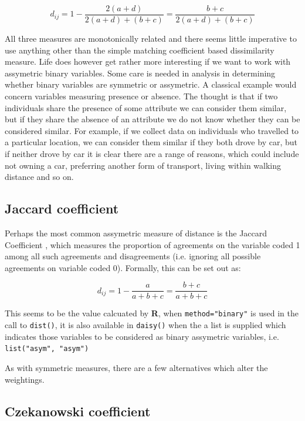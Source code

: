 \begin{displaymath}
d_{ij} = 1 - \frac{2(a + d)}{2(a + d) + (b + c)} = \frac{b + c}{2(a + d) + (b + c)}
\end{displaymath}

All three measures are monotonically related and there seems little imperative to use anything other than the simple matching coefficient based dissimilarity measure.   Life does however get rather more interesting if we want to work with assymetric binary variables.   Some care is needed in analysis in determining whether binary variables are symmetric or assymetric.   A classical example would concern variables measuring presence or absence.   The thought is that if two individuals share the presence of some attribute we can consider them similar, but if they share the absence of an attribute we do not know whether they can be considered similar.   For example, if we collect data on individuals who travelled to a particular location, we can consider them similar if they both drove by car, but if neither drove by car it is clear there are a range of reasons, which could include not owning a car, preferring another form of transport, living within walking distance and so on.

\subsection{Jaccard coefficient}

Perhaps the most common assymetric measure of distance is the Jaccard Coefficient \cite{Sneath:1957}, which measures the proportion of agreements on the variable coded 1 among all such agreements and disagreements (i.e. ignoring all possible agreements on variable coded 0).  Formally, this can be set out as:

\begin{displaymath}
d_{ij} = 1 - \frac{a}{a + b + c} =  \frac{b + c}{a + b + c}
\end{displaymath}

This seems to be the value calcuated by \textbf{R}, when \verb+method="binary"+ is used in the call to \verb+dist()+, it is also available in \verb+daisy()+ when the a list is supplied which indicates those variables to be considered as binary assymetric variables, i.e. \verb+list("asym", "asym")+

As with symmetric measures, there are a few alternatives which alter the weightings.     

\subsection{Czekanowski coefficient}

